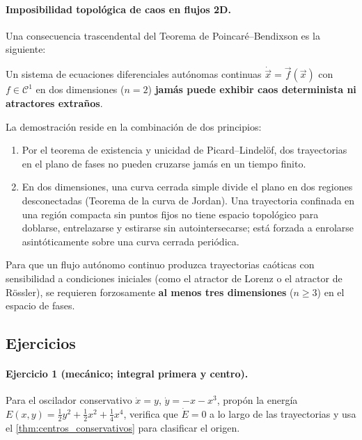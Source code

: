 \paragraph{Imposibilidad topológica de caos en flujos 2D.}
Una consecuencia trascendental del Teorema de Poincaré--Bendixson es la siguiente:
\begin{theorem}
Un sistema de ecuaciones diferenciales autónomas continuas $\dot{\vec{x}} = \vec{f}(\vec{x})$ con $f \in \mathcal{C}^1$ en dos dimensiones ($n = 2$) \textbf{jamás puede exhibir caos determinista ni atractores extraños}.
\end{theorem}

La demostración reside en la combinación de dos principios:
\begin{enumerate}
    \item Por el teorema de existencia y unicidad de Picard--Lindelöf, dos trayectorias en el plano de fases no pueden cruzarse jamás en un tiempo finito.
    \item En dos dimensiones, una curva cerrada simple divide el plano en dos regiones desconectadas (Teorema de la curva de Jordan). Una trayectoria confinada en una región compacta sin puntos fijos no tiene espacio topológico para doblarse, entrelazarse y estirarse sin autointersecarse; está forzada a enrolarse asintóticamente sobre una curva cerrada periódica.
\end{enumerate}

Para que un flujo autónomo continuo produzca trayectorias caóticas con sensibilidad a condiciones iniciales (como el atractor de Lorenz o el atractor de Rössler), se requieren forzosamente \textbf{al menos tres dimensiones} ($n \ge 3$) en el espacio de fases.

\subsection{Ejercicios}

\paragraph{Ejercicio 1 (mecánico; integral primera y centro).} Para el oscilador conservativo $\dot{x}=y$, $\dot{y}=-x-x^3$, propón la energía $E(x,y)=\tfrac12 y^2 + \tfrac12 x^2 + \tfrac14 x^4$, verifica que $\dot E=0$ a lo largo de las trayectorias y usa el \cref{thm:centros_conservativos} para clasificar el origen.

